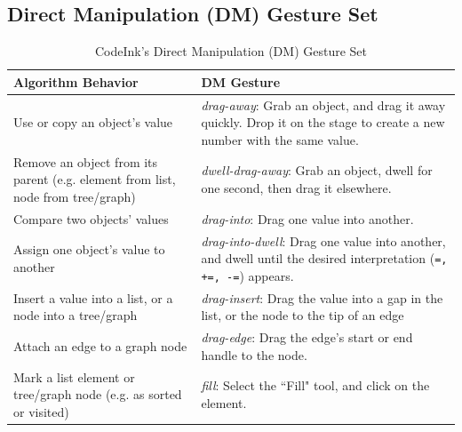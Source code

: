 \subsection{Direct Manipulation (DM) Gesture Set}

\begin{table}[!b]
\renewcommand{\arraystretch}{1.75}
\centering
\begin{tabular}{|p{3.8cm} |p{3.8cm} |}
\hline
\textbf{Algorithm Behavior} & \textbf{DM Gesture} \\
\hline
Use or copy an object's value & {\em drag-away}: Grab an object, and drag it
away quickly.
Drop it on the stage to create a new number with the same value.
\\
\hline
Remove an object from its parent (e.g. element from list, node from tree/graph) & {\em dwell-drag-away}: Grab an object, dwell for one second, then
drag it elsewhere.
\\
\hline
Compare two objects' values & {\em drag-into}: Drag one value into another.
\\
\hline
Assign one object's value to another &
{\em drag-into-dwell}: Drag one value into another, and
dwell until the desired interpretation (\texttt{=, +=, -=}) appears. \\
\hline
Insert a value into a list, or a node into a tree/graph
& {\em drag-insert}: Drag the value into a gap in the list, or the node to the
tip of an edge
\\

\hline
Attach an edge to a graph node
& {\em drag-edge}: Drag the edge's start or end handle to the node.
\\

\hline
Mark a list element or tree/graph node (e.g. as sorted or visited) &
{\em fill}: Select the ``Fill" tool, and click on the element. \\
\hline
\end{tabular}

\caption{CodeInk's Direct Manipulation (DM) Gesture Set}
\label{tbl:gesture_table}

\end{table}


